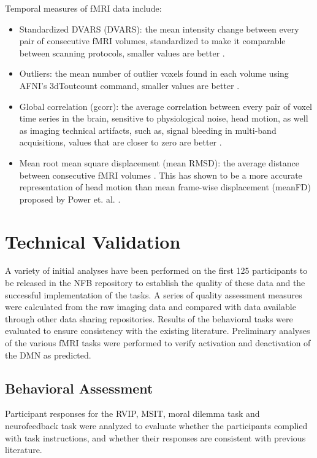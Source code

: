 Temporal measures of fMRI data include:

\begin{itemize}
    \item Standardized DVARS (DVARS): the mean intensity change between every pair of consecutive fMRI volumes, standardized to make it comparable between scanning protocols, smaller values are better \cite{Nichols2012}.
    \item Outliers: the mean number of outlier voxels found in each volume using AFNI’s 3dToutcount command, smaller values are better \cite{Cox1996}.
    \item Global correlation (gcorr): the average correlation between every pair of voxel time series in the brain, sensitive to physiological noise, head motion, as well as imaging technical artifacts, such as, signal bleeding in multi-band acquisitions, values that are closer to zero are better \cite{Saad2013}.
    \item Mean root mean square displacement (mean RMSD): the average distance between consecutive fMRI volumes \cite{Jenkinson99FD}. This has shown to be a more accurate representation of head motion than mean frame-wise displacement (meanFD) proposed by Power et. al. \cite{power2012} \cite{yan2013}.
\end{itemize}

\section{Technical Validation}
A variety of initial analyses have been performed on the first 125 participants to be released in the NFB repository to establish the quality of these data and the successful implementation of the tasks. A series of quality assessment measures were calculated from the raw imaging data and compared with data available through other data sharing repositories. Results of the behavioral tasks were evaluated to ensure consistency with the existing literature. Preliminary analyses of the various fMRI tasks were performed to verify activation and deactivation of the DMN as predicted.

\subsection{Behavioral Assessment}
Participant responses for the RVIP, MSIT, moral dilemma task and neurofeedback task were analyzed to evaluate whether the participants complied with task instructions, and whether their responses are consistent with previous literature.

